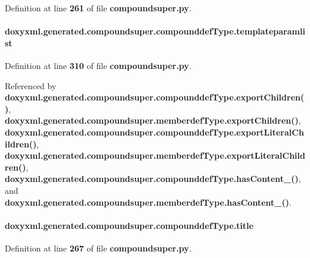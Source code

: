 Definition at line {\bf 261} of file {\bf compoundsuper.\+py}.

\paragraph[{templateparamlist}]{\setlength{\rightskip}{0pt plus 5cm}doxyxml.\+generated.\+compoundsuper.\+compounddef\+Type.\+templateparamlist}\label{classdoxyxml_1_1generated_1_1compoundsuper_1_1compounddefType_a0330da9af356e80af56c8a44e50bec93}


Definition at line {\bf 310} of file {\bf compoundsuper.\+py}.



Referenced by {\bf doxyxml.\+generated.\+compoundsuper.\+compounddef\+Type.\+export\+Children()}, {\bf doxyxml.\+generated.\+compoundsuper.\+memberdef\+Type.\+export\+Children()}, {\bf doxyxml.\+generated.\+compoundsuper.\+compounddef\+Type.\+export\+Literal\+Children()}, {\bf doxyxml.\+generated.\+compoundsuper.\+memberdef\+Type.\+export\+Literal\+Children()}, {\bf doxyxml.\+generated.\+compoundsuper.\+compounddef\+Type.\+has\+Content\+\_\+()}, and {\bf doxyxml.\+generated.\+compoundsuper.\+memberdef\+Type.\+has\+Content\+\_\+()}.

\paragraph[{title}]{\setlength{\rightskip}{0pt plus 5cm}doxyxml.\+generated.\+compoundsuper.\+compounddef\+Type.\+title}\label{classdoxyxml_1_1generated_1_1compoundsuper_1_1compounddefType_a9dda7a745178787b2a65ffcc24c37801}


Definition at line {\bf 267} of file {\bf compoundsuper.\+py}.



